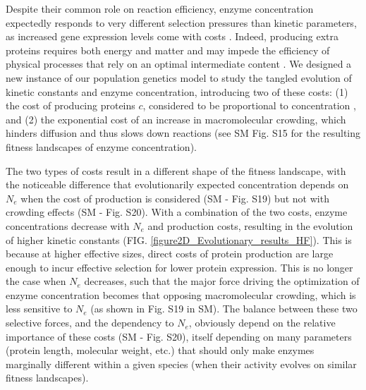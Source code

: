 \documentclass[nogrid,crop,final]{MBE2}%
\begin{document}
Despite their common role on reaction efficiency, enzyme concentration expectedly responds to very different selection pressures than kinetic parameters, as increased gene expression levels come with costs \citep{Wagner05,Lang09,ScottM10,Noor16,Kafri16}. Indeed, producing extra proteins requires both energy and matter \citep{Novick57,Stoebel08,Wagner05,Lynch15} and may impede the efficiency of physical processes that rely on an optimal intermediate content \citep{Dong95,Dill11,Andrews20}. We designed a new instance of our population genetics model to study the tangled evolution of kinetic constants and enzyme concentration, introducing two of these costs: (1) the cost of producing proteins $c$, considered to be proportional to concentration \citep{Wagner05,Chou14,Lynch15}, and (2) the exponential cost of an increase in macromolecular crowding, which hinders diffusion and thus slows down reactions \citep{Dill11,Schavemaker18,Andrews20} 
(see SM Fig. S15 for the resulting fitness landscapes of enzyme concentration).

The two types of costs result in a different shape of the fitness landscape, with the noticeable difference that evolutionarily expected concentration depends on $N_e$ when the cost of production is considered (SM - Fig. S19) but not with crowding effects (SM - Fig. S20). With a combination of the two costs, enzyme concentrations decrease with $N_e$ and production costs, resulting in the evolution of higher kinetic constants (FIG. \ref{figure2D_Evolutionary_results_HF}). This is because at higher effective sizes, direct costs of protein production are large enough to incur effective selection for lower protein expression. This is no longer the case when $N_e$ decreases, such that the major force driving the optimization of enzyme concentration becomes that opposing macromolecular crowding, which is less sensitive to $N_e$ (as shown in Fig. S19 in SM). The balance between these two selective forces, and the dependency to $N_e$, obviously depend on the relative importance of these costs (SM - Fig. S20), itself depending on many parameters (protein length, molecular weight, etc.) that should only make enzymes marginally different within a given species (when their activity evolves on similar fitness landscapes).
\end{document}
